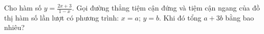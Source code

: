 \begin{question}[type=short_answer,difficulty=1,code={III-6}]
Cho hàm số $y = \frac{2x + 3}{1 - x}$. Gọi đường thẳng tiệm cận đứng và tiệm cận ngang của đồ thị hàm số lần lượt có phương trình: $x = a$; $y = b$. Khi đó tổng $a + 3b$ bằng bao nhiêu?


\end{question}